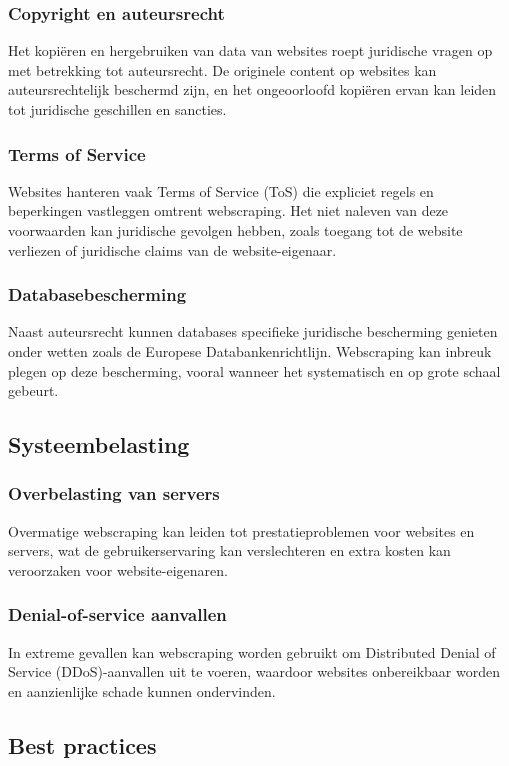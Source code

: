 \subsubsection{Copyright en auteursrecht}
Het kopiëren en hergebruiken van data van websites roept juridische vragen op met betrekking tot auteursrecht. De originele content op websites kan auteursrechtelijk beschermd zijn, en het ongeoorloofd kopiëren ervan kan leiden tot juridische geschillen en sancties.

\subsubsection{Terms of Service}
Websites hanteren vaak Terms of Service (ToS) die expliciet regels en beperkingen vastleggen omtrent webscraping. Het niet naleven van deze voorwaarden kan juridische gevolgen hebben, zoals toegang tot de website verliezen of juridische claims van de website-eigenaar.

\subsubsection{Databasebescherming}
Naast auteursrecht kunnen databases specifieke juridische bescherming genieten onder wetten zoals de Europese Databankenrichtlijn. Webscraping kan inbreuk plegen op deze bescherming, vooral wanneer het systematisch en op grote schaal gebeurt.

\subsection{Systeembelasting}
\subsubsection{Overbelasting van servers}
Overmatige webscraping kan leiden tot prestatieproblemen voor websites en servers, wat de gebruikerservaring kan verslechteren en extra kosten kan veroorzaken voor website-eigenaren.

\subsubsection{Denial-of-service aanvallen}
In extreme gevallen kan webscraping worden gebruikt om Distributed Denial of Service (DDoS)-aanvallen uit te voeren, waardoor websites onbereikbaar worden en aanzienlijke schade kunnen ondervinden.

\subsection{Best practices}
